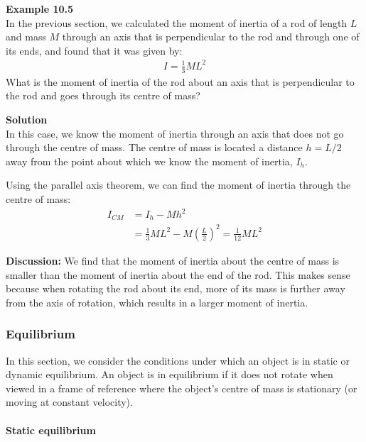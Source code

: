 \begin{framed}
\textbf{Example 10.5}\\
In the previous section, we calculated the moment of inertia of a rod of length $L$ and mass $M$ through an axis that is perpendicular to the rod and through one of its ends, and found that it was given by:
\begin{align*}
I=\frac{1}{3}ML^2
\end{align*}
What is the moment of inertia of the rod about an axis that is perpendicular to the rod and goes through its centre of mass?

\begin{framed}
\textbf{Solution}\\
In this case, we know the moment of inertia through an axis that does not go through the centre of mass. The centre of mass is located a distance $h=L/2$ away from the point about which we know the moment of inertia, $I_h$.

Using the parallel axis theorem, we can find the moment of inertia through the centre of mass:
\begin{align*}
I_{CM} &= I_h - Mh^2\\
&=\frac{1}{3}ML^2 - M \left( \frac{L}{2}\right)^2 = \frac{1}{12}ML^2
\end{align*}

\textbf{Discussion:} We find that the moment of inertia about the centre of mass is smaller than the moment of inertia about the end of the rod. This makes sense because when rotating the rod about its end, more of its mass is further away from the axis of rotation, which results in a larger moment of inertia.
\end{framed}
\end{framed}

\subsubsection{Equilibrium}

In this section, we consider the conditions under which an object is in static or dynamic equilibrium. An object is in equilibrium if it does not rotate when viewed in a frame of reference where the object's centre of mass is stationary (or moving at constant velocity).

\paragraph{Static equilibrium}

